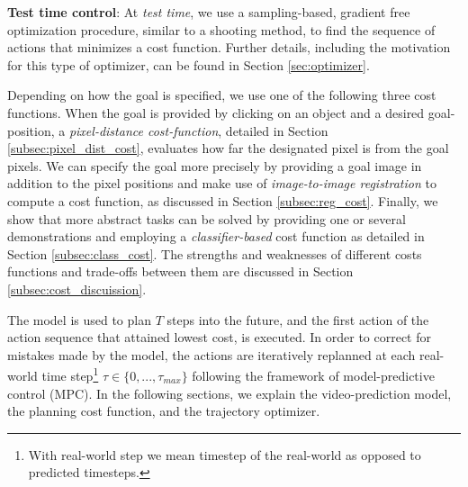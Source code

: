 \noindent \textbf{Test time control}: At \emph{test time}, we use a sampling-based, gradient free optimization procedure, similar to a shooting method,
to find the sequence of actions that minimizes a cost function. Further details, including the motivation for this type of optimizer, can be found in Section \ref{sec:optimizer}. 

Depending on how the goal is specified, we use one of the following three cost functions. When the goal is provided by clicking on an object and a desired goal-position, a \emph{pixel-distance cost-function}, detailed in Section \ref{subsec:pixel_dist_cost}, evaluates how far the designated pixel is from the goal pixels. We can specify the goal more precisely by providing a goal image in addition to the pixel positions and make use of \emph{image-to-image registration} to compute a cost function, as discussed in Section \ref{subsec:reg_cost}. Finally, we show that more abstract
tasks can be solved by providing one or several demonstrations and employing a \emph{classifier-based} cost function as detailed in Section \ref{subsec:class_cost}. The strengths and weaknesses of different costs functions and trade-offs between them are discussed in Section \ref{subsec:cost_discuission}. 

The model is used to plan $T$ steps into the future, and the first action of the action sequence that attained lowest cost, is executed. In order to correct for mistakes made by the model, the actions are iteratively replanned at each real-world time step\footnote{With real-world step we mean timestep of the real-world as opposed to predicted timesteps.} $\tau \in \{0,...,\tau_{max}\}$ following the framework of model-predictive control (MPC). 
In the following sections, we explain the video-prediction model, the planning cost function, and the trajectory optimizer.








